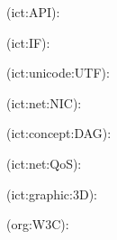 \begin{description}[font=\normalfont,itemsep=0pt]
    \item[\acs{ict:API}]
        (\acl{ict:API}):
            

    \item[\acs{ict:IF}]
        (\acl{ict:IF}):
            

    \item[\acs{ict:unicode:UTF}]
        (\acl{ict:unicode:UTF}):
            

    \item[\acs{ict:net:NIC}]
        (\acl{ict:net:NIC}):
            

    \item[\acs{ict:concept:DAG}]
        (\acl{ict:concept:DAG}):
            

    \item[\acs{ict:net:QoS}]
        (\acl{ict:net:QoS}):
            

    \item[\acs{ict:graphic:3D}]
        (\acl{ict:graphic:3D}):
            

    \item[\acs{org:W3C}]
        (\acl{org:W3C}):
            

\end{description}